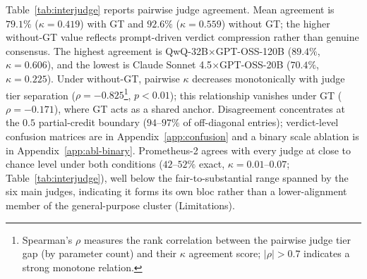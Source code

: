 Table~\ref{tab:interjudge} reports pairwise judge agreement. Mean agreement is $79.1\%$ ($\kappa=0.419$) with GT and $92.6\%$ ($\kappa=0.559$) without GT; the higher without-GT value reflects prompt-driven verdict compression rather than genuine consensus. The highest agreement is QwQ-32B$\times$GPT-OSS-120B ($89.4\%$, $\kappa=0.606$), and the lowest is Claude Sonnet 4.5$\times$GPT-OSS-20B ($70.4\%$, $\kappa=0.225$). Under without-GT, pairwise $\kappa$ decreases monotonically with judge tier separation ($\rho=-0.825$\footnote{Spearman's $\rho$ measures the rank correlation between the pairwise judge tier gap (by parameter count) and their $\kappa$ agreement score; $|\rho|>0.7$ indicates a strong monotone relation.}, $p<0.01$); this relationship vanishes under GT ($\rho=-0.171$), where GT acts as a shared anchor. Disagreement concentrates at the $0.5$ partial-credit boundary ($94$--$97\%$ of off-diagonal entries); verdict-level confusion matrices are in Appendix~\ref{app:confusion} and a binary scale ablation is in Appendix~\ref{app:abl-binary}. Prometheus-2 agrees with every judge at close to chance level under both conditions ($42$--$52\%$ exact, $\kappa = 0.01$--$0.07$; Table~\ref{tab:interjudge}), well below the fair-to-substantial range spanned by the six main judges, indicating it forms its own bloc rather than a lower-alignment member of the general-purpose cluster (Limitations).

